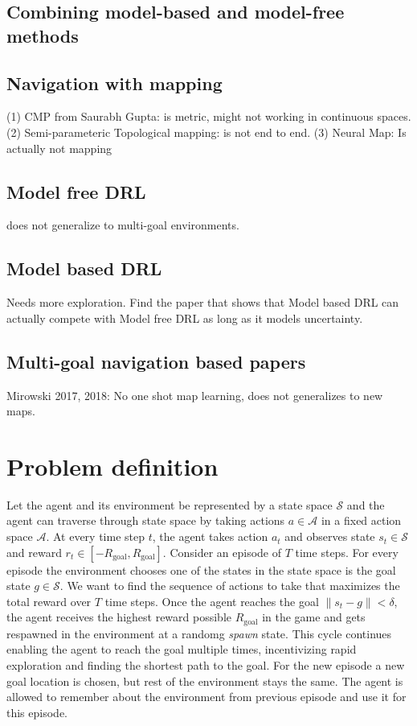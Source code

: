 \documentclass[letterpaper]{article} %
\def\state{s}
\def\act{a}
\def\State{\mathcal{S}}
\def\rew{r}
\newcommand{\Act}{\mathcal{A}}
\newcommand{\goal}{g}
\begin{document}
\subsection{Combining model-based and model-free methods}



\subsection{Navigation with mapping}
 (1) CMP from Saurabh Gupta: is metric, might not working in continuous spaces.
 (2) Semi-parameteric Topological mapping: is not end to end.
 (3) Neural Map: Is actually not mapping

\subsection{Model free DRL }
does not generalize to multi-goal environments.

\subsection{Model based DRL}
Needs more exploration.
Find the paper that shows that Model based DRL can actually compete with Model free DRL as long as it models uncertainty.

\subsection{Multi-goal navigation based papers}
Mirowski 2017, 2018: No one shot map learning, does not generalizes to new maps.

\section{Problem definition}
\newcommand{\Rgoal}{R_{\text{goal}}}
Let the agent and its environment be represented by a state space $\State$ and the
agent can traverse through state space by taking actions $\act \in \Act$ in a
fixed action space $\Act$. At every time step $t$, the agent takes action $\act_t$
and observes state $\state_t \in \State$ and reward
$\rew_t \in [-\Rgoal, \Rgoal]$.
Consider an episode of $T$ time steps.
For every episode the environment chooses one of the states in the state space is
the goal state $\goal \in \State$.
We want to find the sequence of actions to take that
maximizes the total reward over $T$ time steps.
Once the agent reaches the goal $\|\state_t - \goal\| < \delta$, the agent receives the highest reward possible $\Rgoal$ in the game and gets respawned in the environment at a randomg \emph{spawn} state.
This cycle continues enabling the agent to reach the goal multiple times,
incentivizing rapid exploration and finding the shortest path to the goal.
For the new episode a new goal location is chosen, but rest of the environment stays the same.
The agent is allowed to remember about the environment from previous episode and use
it for this episode.
\end{document}
